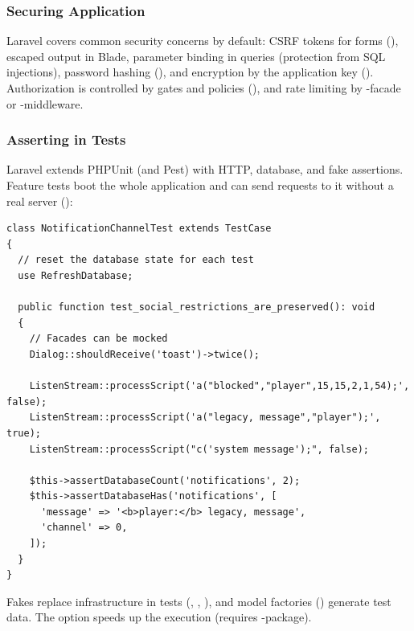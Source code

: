 \subsubsection{Securing Application}

Laravel covers common security concerns by default: CSRF tokens for forms (), escaped
output in Blade, parameter binding in queries (protection from SQL injections), password hashing
(), and encryption by the application key (). Authorization is
controlled by gates and policies (), and rate limiting
by -facade or -middleware.


\subsubsection{Asserting in Tests}

Laravel extends PHPUnit (and Pest) with HTTP, database, and fake assertions. Feature tests boot
the whole application and can send requests to it without a real server
():

\begin{lstlisting}
class NotificationChannelTest extends TestCase
{
  // reset the database state for each test
  use RefreshDatabase;

  public function test_social_restrictions_are_preserved(): void
  {
    // Facades can be mocked
    Dialog::shouldReceive('toast')->twice();

    ListenStream::processScript('a("blocked","player",15,15,2,1,54);', false);
    ListenStream::processScript('a("legacy, message","player");', true);
    ListenStream::processScript("c('system message');", false);

    $this->assertDatabaseCount('notifications', 2);
    $this->assertDatabaseHas('notifications', [
      'message' => '<b>player:</b> legacy, message',
      'channel' => 0,
    ]);
  }
}
\end{lstlisting}

\noindent Fakes replace infrastructure in tests (, ,
), and model factories () generate
test data. The  option speeds up the execution (requires
-package).
